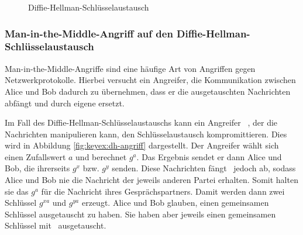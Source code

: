 \begin{figure}[h]
  \begin{center}
  \end{center}
  \caption{Diffie-Hellman-Schlüsselaustausch}
  \label{fig:keyex:dh}
\end{figure}
\subsubsection{Man-in-the-Middle-Angriff auf den
  Diffie-Hellman-Schlüsselaustausch}
Man-in-the-Middle-Angriffe sind eine häufige Art von Angriffen gegen
Netzwerkprotokolle. Hierbei versucht ein Angreifer, die Kommunikation
zwischen Alice und Bob dadurch zu übernehmen, dass er die ausgetauschten
Nachrichten abfängt und durch eigene ersetzt.

Im Fall des Diffie-Hellman-Schlüsselaustauschs kann ein Angreifer \A~,
der die Nachrichten manipulieren kann, den Schlüsselaustausch
kompromittieren. Dies wird in Abbildung \ref{fig:keyex:dh-angriff}
dargestellt. Der Angreifer wählt sich einen Zufallswert
$a$ und berechnet $g^a$. Das Ergebnis sendet er dann Alice und Bob, die
ihrerseits $g^x$ bzw. $g^y$ senden. Diese Nachrichten fängt \A~jedoch
ab, sodass Alice und Bob nie die Nachricht der jeweils anderen Partei
erhalten. Somit halten sie das $g^a$ für die Nachricht ihres
Gesprächspartners. Damit werden dann zwei Schlüssel $g^{xa}$ und
$g^{ya}$ erzeugt. Alice und Bob glauben, einen gemeinsamen Schlüssel
ausgetauscht zu haben. Sie haben aber jeweils einen gemeinsamen
Schlüssel mit \A~ausgetauscht.

